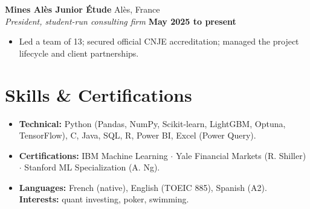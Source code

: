 \documentclass[a4paper,10pt]{article}
\newcommand{\cventry}[4]{
    \vspace{2pt}
    \noindent \textbf{#1} \hfill #2 \\
    \noindent \textit{#3} \hfill \textbf{#4}
}
\newenvironment{cvbullets}{
    \begin{itemize}[itemsep=1.5pt, topsep=2pt, leftmargin=1.1em, label=\tiny$\bullet$]
}{
    \end{itemize} \vspace{1pt}
}
\begin{document}
\cventry{Mines Alès Junior Étude}{Alès, France}{President, student-run consulting firm}{May 2025 to present}
\begin{cvbullets}
    \item Led a team of 13; secured official CNJE accreditation; managed the project lifecycle and client partnerships.
\end{cvbullets}

\section{Skills \& Certifications}

\begin{itemize}[itemsep=1.5pt, topsep=2pt, leftmargin=1.1em, label=\tiny$\bullet$]
    \item \textbf{Technical:} Python (Pandas, NumPy, Scikit-learn, LightGBM, Optuna, TensorFlow), C, Java, SQL, R, Power BI, Excel (Power Query).
    \item \textbf{Certifications:} IBM Machine Learning $\cdot$ Yale Financial Markets (R. Shiller) $\cdot$ Stanford ML Specialization (A. Ng).
    \item \textbf{Languages:} French (native), English (TOEIC 885), Spanish (A2). \quad \textbf{Interests:} quant investing, poker, swimming.
\end{itemize}
\end{document}

